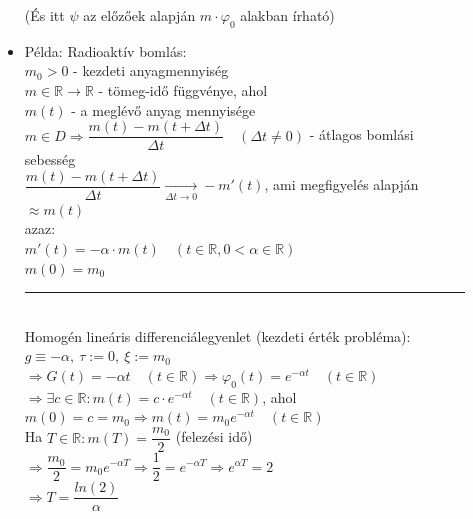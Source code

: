 \documentclass[margin=0px]{article}
\newcommand{\R}{\mathbb{R}}
\begin{document}
\begin{description}
\begin{itemize}
					(És itt $\psi$ az előzőek alapján $m\cdot\varphi_0$ alakban írható)
					\item Példa: Radioaktív bomlás: \\
					$ m_0 > 0$ - kezdeti anyagmennyiség \\
					$ m \in \R \rightarrow \R $ - tömeg-idő függvénye, ahol \\
					$m(t)$ - a meglévő anyag mennyisége \\
					$ m \in D \Rightarrow \dfrac{m(t) - m(t+\Delta t)}{\Delta t} \quad (\Delta t \neq 0) $ - átlagos bomlási sebesség \\
					$ \dfrac{m(t) - m(t+\Delta t)}{\Delta t} \xrightarrow[\Delta t \rightarrow 0]{} -m'(t) $, ami megfigyelés alapján $ \approx m(t)$ \\

					azaz: \\
					$ m'(t) = - \alpha \cdot m(t) \quad (t\in\R, 0 < \alpha \in \R)$\\
					$ m(0) = m_0 $ \\
					\rule{3cm}{0.2pt} \\
					Homogén lineáris differenciálegyenlet (kezdeti érték probléma): \\
					$ g \equiv -\alpha, \ \tau :=0, \ \xi := m_0 $ \\
					$ \Rightarrow G(t) = -\alpha t \quad (t\in\R) \Rightarrow \varphi_0(t) = e^{-\alpha t} \quad (t \in \R)$ \\
					$ \Rightarrow \exists c \in \R : m(t) = c\cdot e^{-\alpha t} \quad (t \in \R)$, ahol \\
					 $m(0) = c = m_0 \Longrightarrow m(t) = m_0e^{-\alpha t} \quad (t \in \R)$ \\
					 Ha $ T \in \R : m(T) = \dfrac{m_0}{2} $ (felezési idő) \\
					 $\Rightarrow \dfrac{m_0}{2} = m_0e^{-\alpha T} \Rightarrow \dfrac{1}{2} = e^{-\alpha T} \Rightarrow e^{\alpha T} = 2$ \\
					 $\Rightarrow T = \dfrac{ln(2)}{\alpha} $
					\end{itemize}
			\end{description}
\end{document}
